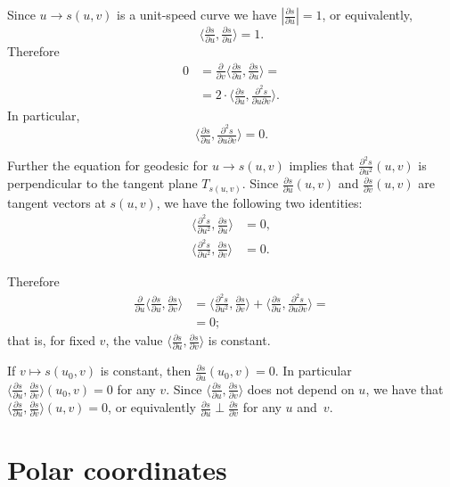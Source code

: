 Since $u\to s(u,v)$ is a unit-speed curve we have $|\tfrac{\partial s}{\partial u}|=1$,
or equivalently,
\[\langle\tfrac{\partial s}{\partial u},\tfrac{\partial s}{\partial u}\rangle=1.\]
Therefore
\begin{align*}
0
&=\tfrac{\partial}{\partial v}\langle\tfrac{\partial s}{\partial u},\tfrac{\partial s}{\partial u}\rangle=
\\
&=2\cdot\langle\tfrac{\partial s}{\partial u},\tfrac{\partial^2 s}{\partial u\partial v}\rangle.
\end{align*}
In particular,
\[\langle\tfrac{\partial s}{\partial u},\tfrac{\partial^2 s}{\partial u\partial v}\rangle=0.\]

Further the equation for geodesic for $u\to s(u,v)$ implies that $\tfrac{\partial^2 s}{\partial u^2}(u,v)$ is perpendicular to the tangent plane $T_{s(u,v)}$.
Since $\tfrac{\partial s}{\partial u}(u,v)$ and $\tfrac{\partial s}{\partial v}(u,v)$ are tangent vectors at $s(u,v)$, we have the following two identities:
\begin{align*}
\langle\tfrac{\partial^2 s}{\partial u^2},\tfrac{\partial s}{\partial u}\rangle&=0,
\\
\langle\tfrac{\partial^2 s}{\partial u^2},\tfrac{\partial s}{\partial v}\rangle&=0.
\end{align*}

Therefore
\begin{align*}
\tfrac{\partial}{\partial u}\langle\tfrac{\partial s}{\partial u},\tfrac{\partial s}{\partial v}\rangle
&=\langle\tfrac{\partial^2 s}{\partial u^2},\tfrac{\partial s}{\partial v}\rangle
+
\langle\tfrac{\partial s}{\partial u},\tfrac{\partial^2 s}{\partial u\partial v}\rangle=
\\
&=0;
\end{align*}
that is, for fixed $v$, the value $\langle\tfrac{\partial s}{\partial u},\tfrac{\partial s}{\partial v}\rangle$ is constant.

If $v\mapsto s(u_0,v)$ is constant, then $\tfrac{\partial s}{\partial u}(u_0,v)=0$.
In particular $\langle\tfrac{\partial s}{\partial u},\tfrac{\partial s}{\partial v}\rangle(u_0,v)=0$ for any $v$.
Since $\langle\tfrac{\partial s}{\partial u},\tfrac{\partial s}{\partial v}\rangle$ does not depend on $u$, we have that $\langle\tfrac{\partial s}{\partial u},\tfrac{\partial s}{\partial v}\rangle(u,v)=0$, or equivalently
$\tfrac{\partial s}{\partial u}\perp \tfrac{\partial s}{\partial v}$ for any $u$ and~$v$.
\qeds

\section*{Polar coordinates}

